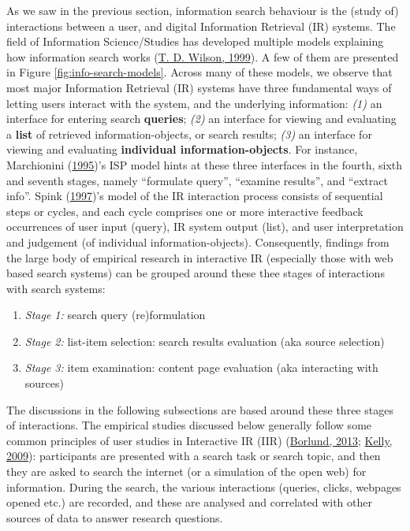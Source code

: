 \documentclass[letterpaper, nobind]{templates/ociamthesis}
\providecommand{\tightlist}{%
  \setlength{\itemsep}{0pt}\setlength{\parskip}{0pt}}
\begin{document}
As we saw in the previous section, information search behaviour is the
(study of) interactions between a user, and digital Information
Retrieval (IR) systems. The field of Information Science/Studies has
developed multiple models explaining how information search works
(\protect\hyperlink{ref-wilson1999models}{T. D. Wilson, 1999}). A few of them are presented in Figure
\ref{fig:info-search-models}. Across many of these models, we
observe that most major Information Retrieval (IR) systems have three
fundamental ways of letting users interact with the system, and the
underlying information: \emph{(1)} an interface for entering search
\textbf{queries}; \emph{(2)} an interface for viewing and evaluating a \textbf{list} of
retrieved information-objects, or search results; \emph{(3)} an interface for
viewing and evaluating \textbf{individual information-objects}. For instance,
Marchionini (\protect\hyperlink{ref-marchionini1995information}{1995})'s ISP model hints at these three
interfaces in the fourth, sixth and seventh stages, namely ``formulate
query'', ``examine results'', and ``extract info''. Spink (\protect\hyperlink{ref-spink1997study}{1997})'s model
of the IR interaction process consists of sequential steps or cycles,
and each cycle comprises one or more interactive feedback occurrences of
user input (query), IR system output (list), and user interpretation and
judgement (of individual information-objects). Consequently, findings
from the large body of empirical research in interactive IR (especially
those with web based search systems) can be grouped around these thee
stages of interactions with search systems:

\begin{enumerate}
\def\labelenumi{\arabic{enumi}.}
\tightlist
\item
  \emph{Stage 1:} search query (re)formulation
\item
  \emph{Stage 2:} list-item selection: search results evaluation (aka source selection)
\item
  \emph{Stage 3:} item examination: content page evaluation (aka interacting with sources)
\end{enumerate}

The discussions in the following subsections are based around these
three stages of interactions. The empirical studies discussed below
generally follow some common principles of user studies in Interactive
IR (IIR) (\protect\hyperlink{ref-borlund2013interactive}{Borlund, 2013}; \protect\hyperlink{ref-kelly2009methods}{Kelly, 2009}): participants are
presented with a search task or search topic, and then they are asked to
search the internet (or a simulation of the open web) for information.
During the search, the various interactions (queries, clicks, webpages
opened etc.) are recorded, and these are analysed and correlated with
other sources of data to answer research questions.
\end{document}
